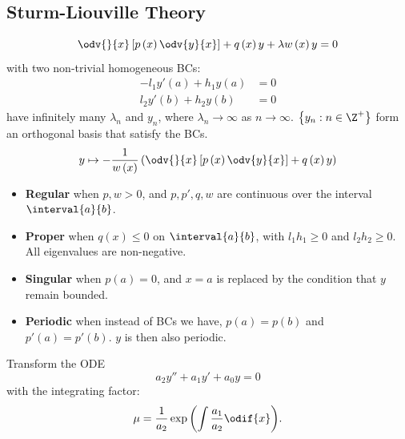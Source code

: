 \documentclass{article}
\begin{document}
\begin{multicols*}{3}
    \section{Sturm-Liouville Theory}
    \begin{equation*}
        \odv{}{x} \left[ p\left( x \right) \odv{y}{x} \right] + q\left( x \right) y + \lambda w\left( x \right) y = 0
    \end{equation*}
    with two non-trivial homogeneous BCs:
    \begin{align*}
        -l_1 y'\left( a \right) + h_1 y\left( a \right) & = 0 \\
        l_2 y'\left( b \right) + h_2 y\left( b \right)  & = 0
    \end{align*}
    have infinitely many \(\lambda_n\) and \(y_n\),
    where \(\lambda_n \to \infty \) as \(n \to \infty\).
    \(\left\{ y_n : n \in \Z^{+} \right\}\) form an orthogonal basis that satisfy the BCs.
    \begin{equation*}
        y \mapsto - \frac{1}{w\left( x \right)} \left( \odv{}{x} \left[ p\left( x \right) \odv{y}{x} \right] + q\left( x \right) y \right)
    \end{equation*}
    \begin{itemize}
        \item \textbf{Regular} when \(p, w > 0\), and \(p, p', q, w\) are continuous
              over the interval \(\interval{a}{b}\).
        \item \textbf{Proper} when \(q\left( x \right) \leqslant 0\) on \(\interval{a}{b}\),
              with \(l_1h_1 \geqslant 0\) and \(l_2h_2 \geqslant 0\).
              All eigenvalues are non-negative.
        \item \textbf{Singular} when \(p\left( a \right) = 0\), and \(x = a\) is replaced by the condition that
              \(y\) remain bounded.
        \item \textbf{Periodic} when instead of BCs we have, \(p\left( a \right) = p\left( b \right)\) and \(p'\left( a \right) = p'\left( b \right)\).
              \(y\) is then also periodic.
    \end{itemize}
    Transform the ODE
    \begin{equation*}
        a_2 y'' + a_1 y' + a_0 y = 0
    \end{equation*}
    with the integrating factor:
    \begin{equation*}
        \mu = \frac{1}{a_2} \exp{\left( \int \frac{a_1}{a_2} \odif{x} \right)}.
    \end{equation*}

\end{multicols*}
\end{document}
